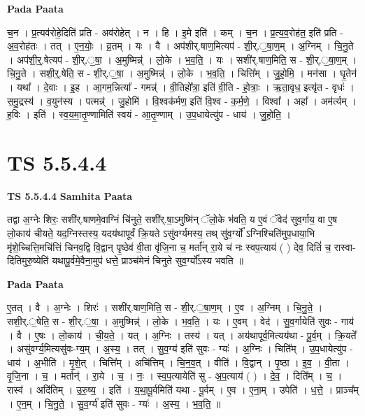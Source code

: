 \documentclass[17pt]{extarticle}
\begin{document}
\textbf{Pada Paata} \newline

च॒न । प्र॒त्यव॑रोहे॒दिति॑ प्रति - अव॑रोहेत् । न । हि । इ॒मे इति॑ । कम् । च॒न । प्र॒त्य॒व॒रोह॑त॒ इति॑ प्रति - अ॒व॒रोह॑तः । तत् । ए॒न॒योः॒ । व्र॒तम् । यः । वै । अप॑शीर्.षाण॒मित्यप॑ - शी॒र्.॒षा॒ण॒म् । अ॒ग्निम् । चि॒नु॒ते । अप॑शी॒र्॒.षेत्यप॑ - शी॒र्.॒षा॒ । अ॒मुष्मिन्न्॑ । लो॒के । भ॒व॒ति॒ । यः । सशी॑र्.षाण॒मिति॒ स - शी॒र्.॒षा॒ण॒म् । चि॒नु॒ते । सशी॒र्॒.षेति॒ स - शी॒र्.॒षा॒ । अ॒मुष्मिन्न्॑ । लो॒के । भ॒व॒ति॒ । चित्ति᳚म् । जु॒हो॒मि॒ । मन॑सा । घृ॒तेन॑ । यथा᳚ । दे॒वाः । इ॒ह । आ॒गम॒न्नित्या᳚ - गमन्न्॑ । वी॒तिहो᳚त्रा॒ इति॑ वी॒ति - हो॒त्राः॒ । ऋ॒ता॒वृध॒ इत्यृ॑त - वृधः॑ । स॒मु॒द्रस्य॑ । व॒युन॑स्य । पत्मन्न्॑ । जु॒होमि॑ । वि॒श्वक॑र्मण॒ इति॑ वि॒श्व - क॒र्म॒णे॒ । विश्वा᳚ । अहा᳚ । अम॑र्त्यम् । ह॒विः । इति॑ । स्व॒य॒मा॒तृ॒ण्णामिति॑ स्वयं - आ॒तृ॒ण्णाम् । उ॒प॒धायेत्यु॑प - धाय॑ । जु॒हो॒ति॒ ।  \newline




\section*{ TS 5.5.4.4 }

\textbf{TS 5.5.4.4 } \newline
\textbf{Samhita Paata} \newline

तद्वा अ॒ग्नेः शिरः॒ सशी॑र्.षाणमे॒वाग्निं चि॑नुते॒ सशी॑र्.षा॒ऽमुष्मि॑न् ॅलो॒के भ॑वति॒ य ए॒वं ॅवेद॑ सुव॒र्गाय॒ वा ए॒ष लो॒काय॑ चीयते॒ यद॒ग्निस्तस्य॒ यदय॑थापूर्वं क्रि॒यते ऽसु॑वर्ग्यमस्य॒ तथ् सु॑व॒र्ग्यो᳚ ऽग्निश्चिति॑मुप॒धाया॒भि मृ॑शे॒च्चित्ति॒मचि॑त्तिं चिनव॒द्वि वि॒द्वान् पृ॒ष्ठेव॑ वी॒ता वृ॑जि॒ना च॒ मर्ता᳚न् रा॒ये च॑ नः स्वप॒त्याय॑ ( ) देव॒ दितिं॑ च॒ रास्वा-दि॑तिमुरु॒ष्येति॑ यथापू॒र्वमे॒वैना॒मुप॑ धत्ते॒ प्राञ्च॑मेनं चिनुते सुव॒र्ग्यो᳚ऽस्य भवति ॥ \newline

\textbf{Pada Paata} \newline

ए॒तत् । वै । अ॒ग्नेः । शिरः॑ । सशी॑र्.षाण॒मिति॒ स - शी॒र्.॒षा॒ण॒म् । ए॒व । अ॒ग्निम् । चि॒नु॒ते॒ । सशी॒र्.॒षेति॒ स - शी॒र्.॒षा॒ । अ॒मुष्मिन्न्॑ । लो॒के । भ॒व॒ति॒ । यः । ए॒वम् । वेद॑ । सु॒व॒र्गायेति॑ सुवः - गाय॑ । वै । ए॒षः । लो॒काय॑ । ची॒य॒ते॒ । यत् । अ॒ग्निः । तस्य॑ । यत् । अय॑थापूर्व॒मित्यय॑था - पू॒र्व॒म् । क्रि॒यते᳚ । असु॑वर्ग्य॒मित्यसु॑वः-ग्य॒म् । अ॒स्य॒ । तत् । सु॒व॒ग्य॑ इति॑ सुवः - ग्यः॑ । अ॒ग्निः । चिति᳚म् । उ॒प॒धायेत्यु॑प - धाय॑ । अ॒भीति॑ । मृ॒शे॒त् । चित्ति᳚म् । अचि॑त्तिम् । चि॒न॒व॒त् । वीति॑ । वि॒द्वान् । पृ॒ष्ठा । इ॒व॒ । वी॒ता । वृ॒जि॒ना । च॒ । मर्तान्॑ । रा॒ये । च॒ । नः॒ । स्व॒प॒त्यायेति॑ सु - अ॒प॒त्याय॑ ( ) । दे॒व॒ । दिति᳚म् । च॒ । रास्व॑ । अदि॑तिम् । उ॒रु॒ष्य॒ । इति॑ । य॒था॒पू॒र्वमिति॑ यथा - पू॒र्वम् । ए॒व । ए॒ना॒म् । उपेति॑ । ध॒त्ते॒ । प्राञ्च᳚म् । ए॒न॒म् । चि॒नु॒ते॒ । सु॒व॒र्ग्य॑ इति॑ सुवः - ग्यः॑ । अ॒स्य॒ । भ॒व॒ति॒ ॥  \newline
\end{document}
